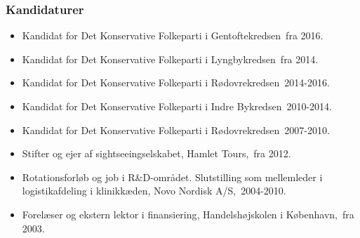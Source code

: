 \documentclass[11pt, a4paper]{awesome-cv}
\begin{document}
\begin{cvletter}
\subsubsection*{Kandidaturer}
\begin{itemize}
\item Kandidat for Det Konservative Folkeparti i Gentoftekredsen fra 2016.
\item Kandidat for Det Konservative Folkeparti i Lyngbykredsen fra 2014.
\item Kandidat for Det Konservative Folkeparti i Rødovrekredsen 2014-2016.
\item Kandidat for Det Konservative Folkeparti i Indre Bykredsen 2010-2014.
\item Kandidat for Det Konservative Folkeparti i Rødovrekredsen 2007-2010.
\end{itemize}
\begin{itemize}
\item Stifter og ejer af sightseeingselskabet, Hamlet Tours, fra 2012.
\item Rotationsforløb og job i R&D-området. Slutstilling som mellemleder i logistikafdeling i klinikkæden, Novo Nordisk A/S, 2004-2010.
\item Forelæser og ekstern lektor i finansiering, Handelshøjskolen i København, fra 2003.
\end{itemize}
\end{cvletter}
\end{document}
